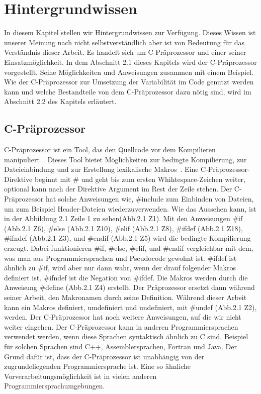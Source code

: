\chapter{Hintergrundwissen}
In diesem Kapitel stellen wir Hintergrundwissen zur Verfügung. Dieses Wissen ist unserer Meinung nach nicht selbstverständlich aber ist von Bedeutung für das Verständnis dieser Arbeit. Es handelt sich um C-Präprozessor und einer seiner Einsatzmöglichkeit. In dem Abschnitt 2.1 dieses Kapitels wird der C-Präprozessor vorgestellt. Seine Möglichkeiten und Anweisungen zusammen mit einem Beispiel. Wie der C-Präprozessor zur Umsetzung der Variabilität im Code genutzt werden kann und welche Bestandteile von dem C-Präprozessor dazu nötig sind, wird im Abschnitt 2.2 des Kapitels erläutert. \\






\section{C-Präprozessor}
C-Präprozessor ist ein Tool, das den Quellcode vor dem Kompilieren manipuliert~\cite{ABKS13}. Dieses Tool bietet Möglichkeiten zur bedingte Kompilierung, zur  Dateieinbindung und zur Erstellung lexikalische Makros~\cite{ABKS13}. Eine C-Präprozessor-Direktive beginnt mit \# und geht bis zum ersten Whihtespace-Zeichen weiter, optional kann nach der Direktive Argument im Rest der Zeile stehen. Der C-Präprozessor hat solche Anweisungen wie, \#include zum Einbinden von Dateien, um zum Beispiel Header-Dateien wiederzuverwenden. Wie das Aussehen kann, ist in der Abbildung 2.1 Zeile 1 zu sehen(Abb.2.1 Z1). Mit den Anweisungen \#if (Abb.2.1 Z6), \#else (Abb.2.1 Z10), \#elif (Abb.2.1 Z8), \#ifdef (Abb.2.1 Z18), \#ifndef (Abb.2.1 Z3), und \#endif (Abb.2.1 Z5) wird die bedingte Kompilierung erzeugt. Dabei funktionieren \#if, \#else, \#elif, und \#endif vergleichbar mit dem, was man aus Programmiersprachen und Pseudocode gewohnt ist. \#ifdef ist ähnlich zu \#if, wird aber nur dann wahr, wenn der drauf folgender Makros definiert ist. \#ifndef ist die Negation von \#ifdef. Die Makros werden durch die Anweisung \#define (Abb.2.1 Z4) erstellt. Der Präprozessor ersetzt dann während seiner Arbeit, den Makronamen durch seine Definition. Während dieser Arbeit kann ein Makros definiert, umdefiniert und undefiniert, mit \#undef (Abb.2.1 Z2), werden. Der C-Präprozessor hat noch weitere Anweisungen, auf die wir nicht weiter eingehen. Der C-Präprozessor kann in anderen Programmiersprachen verwendet werden, wenn diese Sprachen syntaktisch ähnlich zu C sind. Beispiel für solchen Sprachen sind C++, Assemblersprachen, Fortran und Java. Der Grund dafür ist, dass der C-Präprozessor ist unabhängig von der zugrundeliegenden Programmiersprache ist. Eine so ähnliche Vorverarbeitungsmöglichkeit ist in vielen anderen Programmiersprachumgebungen.


